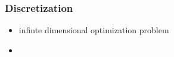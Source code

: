 
\begin{frame}
\frametitle{Discretization}
\begin{itemize}[<+->]
\item infinte dimensional optimization problem
\item[]
\begin{figure}
\centering

\end{figure}
\end{itemize}




\end{frame}